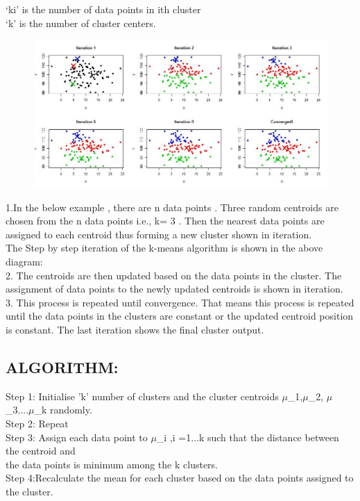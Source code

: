 \documentclass[11pt]{article}
\begin{document}
‘ki’ is the number of data points in ith cluster\\

‘k’ is the number of cluster centers.\\



\begin{figure}\begin{center}
\includegraphics[scale=0.5]{sk1.jpg}
\end{center}

\end{figure}


1.In the below example , there are n data points . Three random centroids are chosen from the n data points i.e., k= 3 . Then the nearest data points are assigned to each centroid thus forming a new cluster shown in iteration.\\

 The Step by step iteration of the k-means algorithm is shown in the above diagram:\\

2. The centroids are then updated based on the data points in the cluster. The assignment of data points to the newly updated centroids is shown in iteration.\\
3. This process is repeated until convergence. That means this process is repeated until the data points in the clusters are constant or the updated centroid position is constant. The last iteration shows the final cluster output. 

\subsection{ALGORITHM:}

Step 1: Initialise 'k' number of clusters and the cluster centroids $ \mu $_1,$ \mu $_2, $ \mu $_3....$ \mu $_k  \textup{randomly.}\\
Step 2: Repeat\\
Step 3: \textup{Assign  each  data  point  to} $ \mu $_i ,i =1...k \textup{ such  that  the  distance  between  the  centroid  and }\\
\textup{ the  data  points  is  minimum  among the k clusters.}\\
Step 4:\textup{Recalculate  the  mean  for  each  cluster} \textup{based  on  the  data  points  assigned  to  the  cluster.}\\
\end{document}
